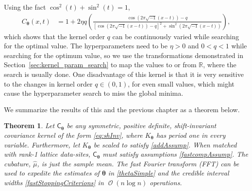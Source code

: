 \documentclass{iitthesis}          %
\DeclareMathOperator{\Order}{{\mathcal O}}
\newcommand{\bm}[1]{\boldsymbol{#1}}
\newcommand{\reals}{\mathbb{R}}
\newcommand{\vtheta}{{\bm{\theta}}}
\newcommand{\mCtheta}{{\mathsf{C}_{\vtheta}}}
\newcommand{\hmu}{\widehat{\mu}}
\newtheorem{theorem}{Theorem}[section]
\begin{document}
Using the fact $\cos^2(t) + \sin^2(t) = 1$,
\begin{align*}
C_\vtheta(x, t) &= 
1 + 2 \eta q
\left(
\frac{ \cos({2 \pi\sqrt{-1} (x-t) }) - q }
{ \left[\cos({ 2 \pi\sqrt{-1} (x-t)})-q\right]^2 + \sin^2({ 2 \pi\sqrt{-1} (x-t)}) }
\right),
\end{align*}
which shows that the kernel order $q$ can be continuously varied while searching for the optimal value. 
The hyperparameters need to be $\eta > 0$ and $ 0 < q < 1$ while searching for the optimum value, so we use the transformations demonstrated in Section~\ref{sec:kernel_param_search} to map the values to or from $\reals$, where the search is usually done.
One disadvantage of this kernel is that it is very sensitive to the changes in kernel order $q \in (0,1)$, for even small values, which might cause the hyperparameter search to miss the global minima.















We summarize the results of this and the previous chapter as a theorem below. 
\begin{theorem}
Let $\mCtheta$ be any symmetric, positive definite, shift-invariant covariance kernel of the form \eqref{eq:shInv}, where $K_\vtheta$ has period one in every variable. Furthermore, let $K_\vtheta$ be scaled to satisfy \eqref{addAssump}. When matched with rank-1 lattice data-sites, $\mCtheta$ must satisfy assumptions \eqref{fastcompAssump}. The cubature, $\hmu$, is just the sample mean. 
The \emph{fast Fourier transform} (FFT) can be used to expedite the estimates of $\vtheta$ in \eqref{thetaSimple} and the credible interval widths \eqref{fastStoppingCriterions} in $\Order(n \log n)$ operations. 

\end{theorem}
\end{document}
